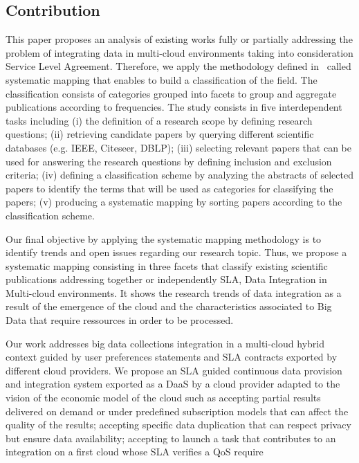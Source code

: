 \subsection{Contribution}
This paper proposes an analysis of existing works fully or partially addressing the problem of integrating data in multi-cloud environments taking into consideration Service Level Agreement. Therefore, we apply the  methodology defined in~\cite{SM:Petersen:2008} called  systematic mapping  that enables to build a classification of the field. The classification consists of categories grouped into facets  to group and aggregate  publications according to frequencies. The study consists in  five interdependent tasks including (i) the definition of a research scope by defining research questions; (ii) retrieving candidate papers by querying different scientific databases (e.g. IEEE, Citeseer, DBLP); (iii) selecting relevant papers that can be used for answering the research questions by defining inclusion and exclusion criteria; (iv) defining a classification scheme by  analyzing the abstracts of selected papers to identify the terms that will be used as categories for classifying the papers; (v) producing a systematic mapping by sorting papers according to the classification scheme. 

Our final objective by applying the systematic mapping methodology is to identify trends and open issues regarding our research topic. Thus, we propose a systematic mapping consisting in three facets that classify existing scientific publications addressing  together or independently SLA, Data Integration in Multi-cloud environments. It shows the research trends of data integration as a result of the emergence of the cloud and the characteristics associated to Big Data that require ressources in order to be processed.


Our work addresses big data collections integration  in a multi-cloud hybrid context guided by user preferences statements and SLA contracts exported by different cloud providers. We propose an SLA guided continuous data provision and integration system exported as a DaaS by a cloud provider adapted to the vision of the economic model of the cloud such as accepting partial results delivered on demand or under predefined subscription models that can affect the quality of the results; accepting specific data duplication that can respect privacy but ensure data availability; accepting to launch a task that contributes to an integration on a first cloud whose SLA verifies a QoS require

